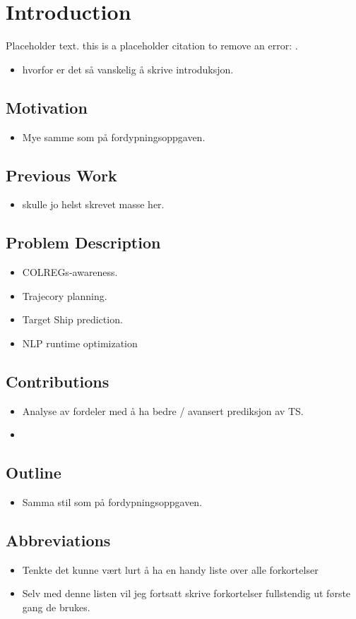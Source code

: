 \section{Introduction}
Placeholder text. this is a placeholder citation to remove an error: \cite{breivik2017mpc}.
\begin{itemize}
    \item hvorfor er det så vanskelig å skrive introduksjon.
\end{itemize}
\subsection{Motivation}
\begin{itemize}
    \item Mye samme som på fordypningsoppgaven.

\end{itemize}

\subsection{Previous Work}
\begin{itemize}
    \item skulle jo helst skrevet masse her.
\end{itemize}

\subsection{Problem Description}
\begin{itemize}
    \item COLREGs-awareness.
    \item Trajecory planning.
    \item Target Ship prediction.
    \item NLP runtime optimization
\end{itemize}

\subsection{Contributions}
\begin{itemize}
    \item Analyse av fordeler med å ha bedre / avansert prediksjon av TS.
    \item 
\end{itemize}

\subsection{Outline}
\begin{itemize}
    \item Samma stil som på fordypningsoppgaven.
\end{itemize}

\subsection{Abbreviations}
\begin{itemize}
    \item Tenkte det kunne vært lurt å ha en handy liste over alle forkortelser
    \item Selv med denne listen vil jeg fortsatt skrive forkortelser fullstendig ut første gang de brukes.
\end{itemize}

\newpage